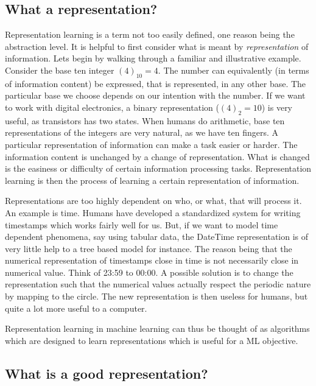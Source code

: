 \documentclass[../../thesis.tex]{subfiles}
\begin{document}
\subsection{What a representation?}

Representation learning is a term not too easily defined, one reason being the abstraction level. It is helpful to first consider what is meant by \textit{representation} of information. Lets begin by walking through a familiar and illustrative example. Consider the base ten integer $(4)_{10} = 4$. The number can equivalently (in terms of information content) be expressed, that is represented, in any other base. The particular base we choose depends on our intention with the number. If we want to work with digital electronics, a binary representation ($(4)_{2} = 10$) is very useful, as transistors has two states. When humans do arithmetic, base ten representations of the integers are very natural, as we have ten fingers. A particular representation of information can make a task easier or harder. The information content is unchanged by a change of representation. What is changed is the easiness or difficulty of certain information processing tasks. Representation learning is then the process of learning a certain representation of information. \newline

Representations are too highly dependent on who, or what, that will process it. An example is time. Humans have developed a standardized system for writing timestamps which works fairly well for us. But, if we want to model time dependent phenomena, say using tabular data, the DateTime representation is of very little help to a tree based model for instance. The reason being that the numerical representation of timestamps close in time is not necessarily close in numerical value. Think of 23:59 to 00:00. A possible solution is to change the representation such that the numerical values actually respect the periodic nature by mapping to the circle. The new representation is then useless for humans, but quite a lot more useful to a computer. \newline

Representation learning in machine learning can thus be thought of as algorithms which are designed to learn representations which is useful for a ML objective.


\subsection{What is a good representation?}
\end{document}
